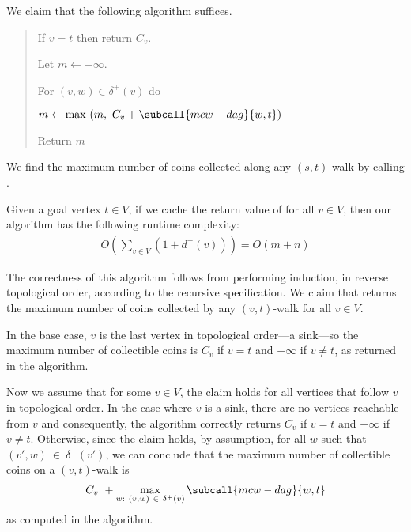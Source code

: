\documentclass{article}
\begin{document}
\begin{solution}
We claim that the following algorithm suffices.

\begin{quote}%


\begin{steps}
    \item If $v = t$ then return $C_v$.
    \item Let $m \leftarrow -\infty$.
    \item For $(v,w)\in \delta^+(v)$ do
    \begin{steps}
        \item $m \leftarrow \max \ (m, \ C_v + \subcall{mcw-dag}{w, t})$
    \end{steps}
  \item Return $m$
\end{steps}
\end{quote}

We find the maximum number of coins collected along any $(s,t)$-walk by calling .


\begin{subproof} [Runtime]
Given a goal vertex $t \in V$, if we cache the return value of  for all $v \in V$, then our algorithm has the following runtime complexity:
\begin{align*}
    O \left( \sum_{v\in V} ( 1 +  d^+(v) ) \right) = O \left( m+n \right)
\end{align*}
\vspace{-0.5cc}
\end{subproof}

\vspace{-0.5cc}
\begin{subproof} [Correctness]
The correctness of this algorithm follows from performing induction, in reverse topological order, according to the recursive specification. We claim that  returns the maximum number of coins collected by any $(v,t)$-walk for all $v \in V$.

In the base case, $v$ is the last vertex in topological order---a sink---so the maximum number of collectible coins is $C_v$ if $v=t$ and $-\infty$ if $v \not= t$, as returned in the algorithm.

Now we assume that for some $v \in V$, the claim holds for all vertices that follow $v$ in topological order. In the case where $v$ is a sink, there are no vertices reachable from $v$ and consequently, the algorithm correctly returns $C_v$ if $v=t$ and $-\infty$ if $v \not= t$. Otherwise, since the claim holds, by assumption, for all $w$ such that $(v',w) \ \in \ \delta^{+}(v')$, we can conclude that the maximum number of collectible coins on a $(v, t)$-walk is
\begin{align*}
    C_{v} \ + \max_{w : \ (v,w) \ \in \ \delta^{+}(v)} \subcall{mcw-dag}{w, t}
\end{align*}
as computed in the algorithm.


\end{subproof}
\end{solution}
\end{document}
